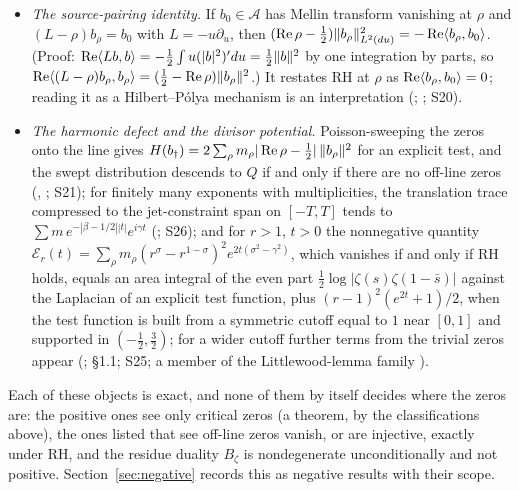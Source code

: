 \begin{itemize}
\[
B_\zeta(F,G)=\frac1{2\pi i}\Big(\int_{\re s=2}-\int_{\re s=-1}\Big)\frac{F(s)G(1-s)}{\zeta(s)}\,ds
\]
satisfies $|B_\zeta(F,G)|\le\zeta(2)(1+4\pi^2)\pi^{-1}\,b_{2,1}(F)\,b_{2,1}(G)$, descends to $Q$, is nondegenerate, has local determinant $(m!/\zeta^{(m)}(\rho))^m$, and satisfies $B(T_ax,T_ay)=aB(x,y)$ and $B(Lx,y)=B(x,(1-L)y)$; it is not positive (;  Lemma 26.1; S49).
\item \emph{The source-pairing identity.} If $b_0\in\mathcal{A}$ has Mellin transform vanishing at $\rho$ and $(L-\rho)b_\rho=b_0$ with $L=-u\partial_u$, then $(\operatorname{Re}\rho-\tfrac12)\|b_\rho\|^2_{L^2(du)}=-\operatorname{Re}\langle b_\rho,b_0\rangle$. (Proof: $\operatorname{Re}\langle Lb,b\rangle=-\tfrac12\int u(|b|^2)'du=\tfrac12\|b\|^2$ by one integration by parts, so $\operatorname{Re}\langle(L-\rho)b_\rho,b_\rho\rangle=(\tfrac12-\operatorname{Re}\rho)\|b_\rho\|^2$.) It restates RH at $\rho$ as $\operatorname{Re}\langle b_\rho,b_0\rangle=0$; reading it as a Hilbert--Pólya mechanism is an interpretation (; ; S20).
\item \emph{The harmonic defect and the divisor potential.} Poisson-sweeping the zeros onto the line gives $H(b_\dagger)=2\sum_\rho m_\rho|\operatorname{Re}\rho-\tfrac12|\,\|b_\rho\|^2$ for an explicit test, and the swept distribution descends to $Q$ if and only if there are no off-line zeros (, ; S21); for finitely many exponents with multiplicities, the translation trace compressed to the jet-constraint span on $[-T,T]$ tends to $\sum m\,e^{-|\beta-1/2||t|}e^{i\gamma t}$ (; S26); and for $r>1$, $t>0$ the nonnegative quantity $\mathcal{E}_r(t)=\sum_\rho m_\rho(r^\sigma-r^{1-\sigma})^2e^{2t(\sigma^2-\gamma^2)}$, which vanishes if and only if RH holds, equals an area integral of the even part $\tfrac12\log|\zeta(s)\zeta(1-\bar s)|$ against the Laplacian of an explicit test function, plus $(r-1)^2(e^{2t}+1)/2$, when the test function is built from a symmetric cutoff equal to $1$ near $[0,1]$ and supported in $(-\tfrac12,\tfrac32)$; for a wider cutoff further terms from the trivial zeros appear (;  §1.1; S25; a member of the Littlewood-lemma family \cite{BalazardSaiasYor,SekatskiiBeltraminelliMerlini}).
\end{itemize}
Each of these objects is exact, and none of them by itself decides where the zeros are: the positive ones see only critical zeros (a theorem, by the classifications above), the ones listed that see off-line zeros vanish, or are injective, exactly under RH, and the residue duality $B_\zeta$ is nondegenerate unconditionally and not positive. Section~\ref{sec:negative} records this as negative results with their scope.
